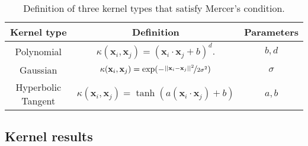 \begin{table}[h]
    \centering
    \begin{tabular}{|c|c|c|}
    \hline
    Kernel type & Definition & Parameters \\
    \hline
    Polynomial & $\kappa(\textbf{x}_i, \textbf{x}_j) = (\textbf{x}_i \cdot \textbf{x}_j + b)^d.$ & $b, d$ \\
    Gaussian & $\kappa(\textbf{x}_i, \textbf{x}_j) =\exp (-\nicefrac{||\textbf{x}_i - \textbf{x}_j||^2}{2\sigma^2})$ & $\sigma$ \\
    Hyperbolic Tangent & $\kappa(\textbf{x}_i, \textbf{x}_j) = \tanh (a(\textbf{x}_i \cdot \textbf{x}_j) + b)$ & $a, b$ \\
    \hline
    \end{tabular}
    \caption{Definition of three kernel types that satisfy Mercer's condition.}
    \label{tab:kernels}
\end{table}

\subsection{Kernel results}


